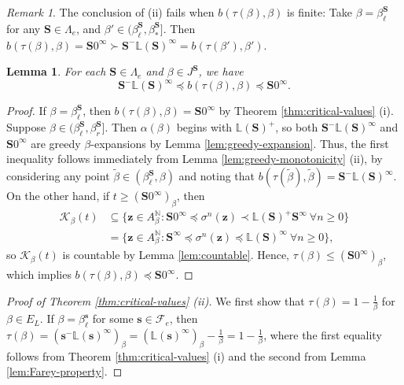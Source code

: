 \documentclass[12pt]{amsart}
\newtheorem{lemma}[theorem]{Lemma}
\theoremstyle{definition}
\theoremstyle{remark}
\newtheorem{remark}[theorem]{Remark}
\numberwithin{equation}{section}
\newcommand{\N}{\ensuremath{\mathbb{N}}}
\renewcommand{\L}{\ensuremath{\mathbb{L}}}
\newcommand{\cF}{\mathcal{F}}
\newcommand{\s}{ {\mathbf{s}}}
\newcommand{\cs}{ {\mathbf{S}}}
\newcommand{\z}{\mathbf{z}}
\newcommand{\f}{\infty}
\newcommand{\al}{\alpha}
\newcommand{\lle}{\preccurlyeq}
\newcommand{\si}{\sigma}
\newcommand{\La}{\Lambda}
\newcommand{\K}{\mathcal K}
\begin{document}
{\begin{remark}
The conclusion of (ii) fails when $b(\tau(\beta),\beta)$ is finite: Take $\beta=\beta_\ell^\cs$ for any $\cs\in\La_e$, and $\beta'\in (\beta_\ell^\cs,\beta_*^\cs]$. Then $b(\tau(\beta),\beta)=\cs 0^\f\succ \cs^-\L(\cs)^\f=b(\tau(\beta'),\beta')$.
\end{remark}

\begin{lemma} \label{lem:tight-bounds}
For each $\cs\in\La_e$ and $\beta\in J^\cs$, we have
\[
\cs^-\L(\cs)^\f\lle b(\tau(\beta),\beta)\lle \cs 0^\f.
\]
\end{lemma}

\begin{proof}
If $\beta=\beta_\ell^\cs$, then $b(\tau(\beta),\beta)=\cs 0^\f$ by Theorem \ref{thm:critical-values} (i). Suppose $\beta\in (\beta_\ell^\cs,\beta_r^\cs]$. Then $\al(\beta)$ begins with $\L(\cs)^+$, so both $\cs^-\L(\cs)^\f$ and $\cs 0^\f$ are greedy $\beta$-expansions by Lemma \ref{lem:greedy-expansion}. Thus, the first inequality follows immediately from Lemma \ref{lem:greedy-monotonicity} (ii), by considering any point $\tilde{\beta}\in(\beta_\ell^\cs,\beta)$ and noting that $b(\tau(\tilde{\beta}),\tilde{\beta})=\cs^-\L(\cs)^\f$.
On the other hand, if $t\geq (\cs 0^\f)_\beta$, then
\begin{align*}
\K_\beta(t)&\subseteq \{\z\in A_\beta^\N: \cs 0^\f\lle \si^n(\z)\prec \L(\cs)^+ \cs^\f\ \forall n\geq 0\}\\
&=\{\z\in A_\beta^\N: \cs^\f\lle \si^n(\z)\lle \L(\cs)^\f\ \forall n\geq 0\},
\end{align*}
so $\K_\beta(t)$ is countable by Lemma \ref{lem:countable}. Hence, $\tau(\beta)\leq (\cs 0^\f)_\beta$, which implies $b(\tau(\beta),\beta)\lle \cs 0^\f$.
\end{proof}

\begin{proof}[Proof of Theorem \ref{thm:critical-values} (ii)]
We first show that $\tau(\beta)=1-\frac{1}{\beta}$ for $\beta\in E_L$. If $\beta=\beta_\ell^\s$ for some $\s\in\cF_e$, then $\tau(\beta)=(\s^-\L(\s)^\f)_\beta=(\L(\s)^\f)_\beta-\frac{1}{\beta}=1-\frac{1}{\beta}$, where the first equality follows from Theorem \ref{thm:critical-values} (i) and the second from Lemma \ref{lem:Farey-property}.


\end{proof}}
\end{document}
